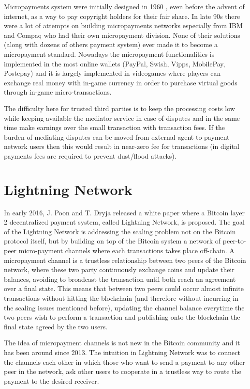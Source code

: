 		Micropayments system were initially designed in 1960 \cite{Nelson1960}, even before the advent of internet, as a way to pay copyright holders for their fair share. In late 90s there were a lot of attempts on building micropayments networks especially from IBM and Compaq who had their own micropayment division. None of their solutions (along with dozens of others payment system) ever made it to become a micropayment standard. Nowadays the micropayment functionalities is implemented in the most online wallets (PayPal, Swish, Vipps, MobilePay, Postepay) and it is largely implemented in videogames where players can exchange real money with in-game currency in order to purchase virtual goods through in-game micro-transactions. 
		
		The difficulty here for trusted third parties is to keep the processing costs low while keeping available the mediator service in case of disputes and in the same time make earnings over the small transaction with transaction fees. If the burden of mediating disputes can be moved from external agent to payment network users then this would result in near-zero fee for transactions (in digital payments fees are required to prevent dust/flood attacks).
		
		\section{Lightning Network}
		
		In early 2016, J. Poon and T. Dryja released a white paper where a Bitcoin layer 2 decentralized payment system, called Lightning Network, is proposed. The goal of the Lightning Network is addressing the scaling problem not on the Bitcoin protocol itself, but by building on top of the Bitcoin system a network of peer-to-peer micro-payment channels where each transactions takes place off-chain.
		A micropayment channel is a trustless relationship between two peers of the Bitcoin network, where these two party continuously exchange coins and update their balances, avoiding to broadcast the transaction until both reach an agreement over a final state. This means that between two peers could occur almost infinite transactions without hitting the blockchain (and therefore without incurring in the scaling issues mentioned before), updating the channel balance everytime the two peers wish to perform a transaction and publishing onto the blockchain the final state agreed by the two users.
		
		 The idea of micropayment channels is not new in the Bitcoin community and it has been around since 2013\cite{Micropayments:Online}\cite{Micropayments:Bitcoinj}. The intuition in Lightning Network was to connect the channels each other in which those who want to send a payment to any other peer in the network, ask other users to cooperate in a trustless way to route the payment to the desired receiver.
		
